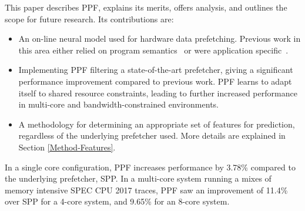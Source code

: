 
This paper describes PPF, explains its merits, offers analysis, and
outlines the scope for future research. Its contributions are:

\begin{itemize}

\item An on-line neural model used for hardware data prefetching.
  Previous work in this area either relied on program
  semantics~\cite{Semantics} or were application
  specific~\cite{Datacenter}.

\item Implementing PPF filtering a state-of-the-art prefetcher, giving
  a significant performance improvement compared to previous work. PPF
  learns to adapt itself to shared resource constraints, leading to
  further increased performance in multi-core and
  bandwidth-constrained environments.

\item A methodology for determining an appropriate set of features for
  prediction, regardless of the underlying prefetcher used.  More
  details are explained in Section \ref{Method-Features}.

\end{itemize}

In a single core configuration, PPF increases performance by 3.78\%
compared to the underlying prefetcher, SPP. In a multi-core system running a
mixes of memory intensive SPEC CPU 2017 traces, PPF saw an improvement
of 11.4\% over SPP for a 4-core system, and 9.65\% for an 8-core system.

